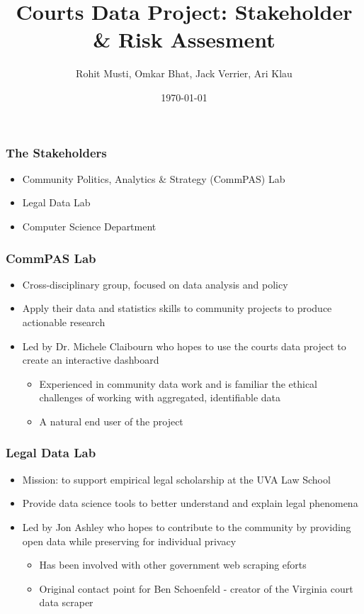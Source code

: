 \documentclass{beamer}
\title{Courts Data Project: Stakeholder \& Risk Assesment}
\author{Rohit Musti, Omkar Bhat, Jack Verrier, Ari Klau}
\institute{Innovating in the Public Interest}
\date{\today}
\begin{document}
 
\frame{\titlepage}

\begin{frame}
\frametitle{The Stakeholders}
\begin{itemize}
    \item Community Politics, Analytics \& Strategy (CommPAS) Lab
    \item Legal Data Lab
    \item Computer Science Department
\end{itemize}
\end{frame}

\begin{frame}
\frametitle{CommPAS Lab}
\begin{itemize}
    \item Cross-disciplinary group, focused on data analysis and policy
    \item Apply their data and statistics skills to community projects to produce actionable research
    \item Led by Dr. Michele Claibourn who hopes to use the courts data project to create an interactive dashboard
    \begin{itemize}
        \item Experienced in community data work and is familiar the ethical challenges of working with aggregated, identifiable data
        \item A natural end user of the project
    \end{itemize}
\end{itemize}
\end{frame}

\begin{frame}
\frametitle{Legal Data Lab}
\begin{itemize}
    \item Mission: to support  empirical legal scholarship at the UVA Law School
    \item Provide data science tools to better understand and explain legal phenomena
    \item Led by Jon Ashley who hopes to contribute to the community by providing open data while preserving for individual privacy
    \begin{itemize}
        \item Has been involved with other government web scraping eforts
        \item Original contact point for Ben Schoenfeld - creator of the Virginia court data scraper
    \end{itemize}
\end{itemize}
\end{frame}
\end{document}
